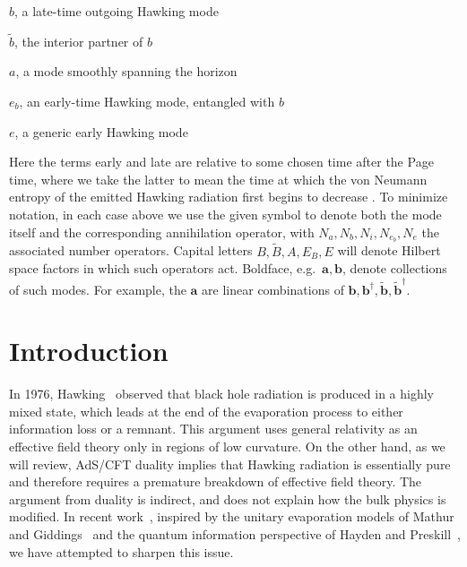 \documentclass[12pt]{article}
\begin{document}
\indent

$b$, a late-time outgoing Hawking mode

$\tilde b$, the interior partner of $b$

$a$, a mode smoothly spanning the horizon

 $e_b$, an early-time Hawking mode, entangled with $b$

 $e$, a generic early Hawking mode

Here the terms early and late are relative to some chosen time after the Page time, where we take the latter to mean the time at which the von Neumann entropy of the emitted Hawking radiation first begins to decrease \cite{Page:1993df}.  To minimize notation, in each case above we use the given symbol to denote both the mode itself and the corresponding annihilation operator, with $N_a,N_b,N_i,N_{e_b},N_e$ the associated number operators.  Capital letters $B,\tilde B, A ,E_B, E$ will denote Hilbert space factors in which such operators act.  Boldface, e.g.\ $\bm a, \bm b$, denote collections of such modes. For example, the $\bm a$ are linear combinations of $\bm b, \bm b^\dagger, \tilde {\bm b}, \tilde {\bm b}^\dagger$.

\section{Introduction}

In 1976, Hawking~\cite{Hawking:1976ra} observed that black hole radiation is produced in a highly mixed state, which leads at the end of the evaporation process  to either information loss or  a remnant.  This argument uses general relativity as an effective field theory only in regions of low curvature.  On the other hand, as we will review, AdS/CFT duality implies that Hawking radiation is essentially pure and therefore requires a premature breakdown of effective field theory.  The argument from duality is indirect, and does not explain how the bulk physics is modified.  In recent work~\cite{Almheiri:2012rt}, inspired by the unitary evaporation models  of Mathur
\cite{Mathur:2009hf} and Giddings~\cite{Giddings:2011ks,Giddings:2012bm}
and the quantum information perspective of Hayden and Preskill~\cite{Hayden:2007cs}, we have attempted to sharpen this issue.
\end{document}
